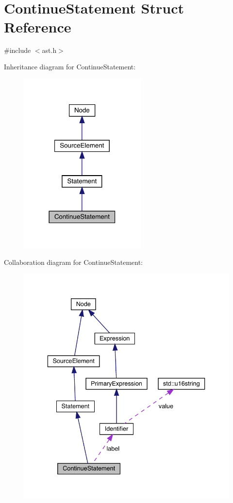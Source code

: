 \hypertarget{struct_continue_statement}{}\section{Continue\+Statement Struct Reference}
\label{struct_continue_statement}


{\ttfamily \#include $<$ast.\+h$>$}



Inheritance diagram for Continue\+Statement\+:
\nopagebreak
\begin{figure}[H]
\begin{center}
\leavevmode
\includegraphics[width=182pt]{struct_continue_statement__inherit__graph}
\end{center}
\end{figure}


Collaboration diagram for Continue\+Statement\+:
\nopagebreak
\begin{figure}[H]
\begin{center}
\leavevmode
\includegraphics[width=336pt]{struct_continue_statement__coll__graph}
\end{center}
\end{figure}
